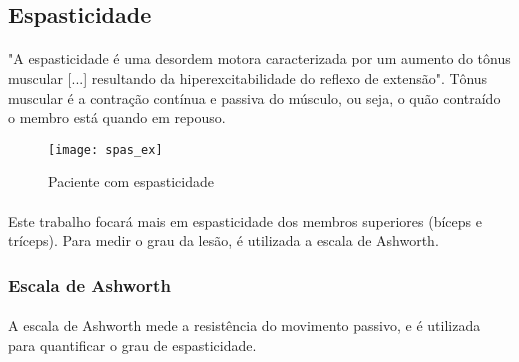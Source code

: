 	\subsection{Espasticidade}
	\paragraph{}"A espasticidade é uma desordem motora caracterizada por um aumento do tônus muscular [...] resultando da hiperexcitabilidade do reflexo de extensão".\cite{Lance80} Tônus muscular é a contração contínua e passiva do músculo, ou seja, o quão contraído o membro está quando em repouso.
	
	\begin{figure}[H]
		\centering
		\texttt{[image: spas\_ex]}
		\caption{Paciente com espasticidade}
		\label{fig:spasticity}
	\end{figure}
	
	\paragraph{}Este trabalho focará mais em espasticidade dos membros superiores (bíceps e tríceps). Para medir o grau da lesão, é utilizada a escala de Ashworth.
	
	\subsubsection{Escala de Ashworth}
	\paragraph{}A escala de Ashworth mede a resistência do movimento passivo, e é utilizada para quantificar o grau de espasticidade.
	
